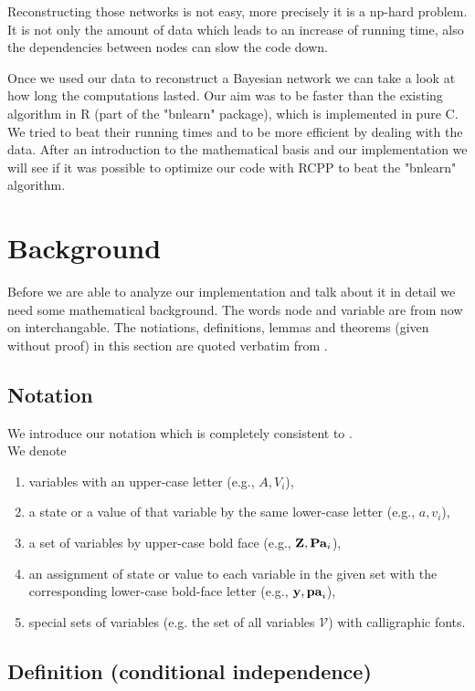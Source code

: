 Reconstructing those networks is not easy, more precisely it is a np-hard problem. It is not only the amount of data which leads to an increase of running time, also the dependencies between nodes can slow the code down.

Once we used our data to reconstruct a Bayesian network we can take a look at how long the computations lasted. Our aim was to be faster than the existing algorithm in R (part of the "bnlearn" package), which is implemented in pure C. We tried to beat their running times and to be more efficient by dealing with the data. After an introduction to the mathematical basis and our implementation we will see if it was possible to optimize our code with RCPP to beat the "bnlearn" algorithm.

\chapter{Background}

	Before we are able to analyze our implementation and talk about it in detail we need some mathematical background. The words node and variable are from now on interchangable. The notiations, definitions, lemmas and theorems (given without proof) in this section are quoted verbatim from \cite{TBA}.

	\section*{Notation}

		We introduce our notation which is completely consistent to \cite{TBA}.\\
		We denote
		\begin{enumerate}
			\item variables with an upper-case letter (e.g., $A, V_{i}$),
			\item a state or a value of that variable by the same lower-case letter (e.g., $a, v_{i}$),
			\item a set of variables by upper-case bold face (e.g., ${\textbf{Z}}, {\textbf{Pa}}_{i}$),
			\item an assignment of state or value to each variable in the given set with the corresponding lower-case bold-face letter (e.g., ${\textbf{y}}, {\textbf{pa}}_{i}$),
			\item special sets of variables (e.g. the set of all variables $\mathcal{V}$) with calligraphic fonts.
		\end{enumerate}

	\section*{Definition (conditional independence)} \label{s.Def1}
	
